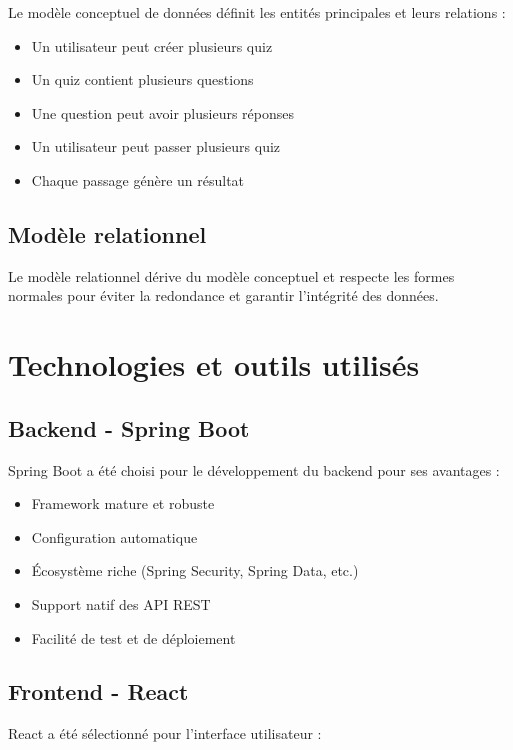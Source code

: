 \documentclass[12pt,a4paper]{report}
\begin{document}
Le modèle conceptuel de données définit les entités principales et leurs relations :

\begin{itemize}
    \item Un utilisateur peut créer plusieurs quiz
    \item Un quiz contient plusieurs questions
    \item Une question peut avoir plusieurs réponses
    \item Un utilisateur peut passer plusieurs quiz
    \item Chaque passage génère un résultat
\end{itemize}

\subsection{Modèle relationnel}

Le modèle relationnel dérive du modèle conceptuel et respecte les formes normales pour éviter la redondance et garantir l'intégrité des données.

\section{Technologies et outils utilisés}

\subsection{Backend - Spring Boot}

Spring Boot a été choisi pour le développement du backend pour ses avantages :

\begin{itemize}
    \item Framework mature et robuste
    \item Configuration automatique
    \item Écosystème riche (Spring Security, Spring Data, etc.)
    \item Support natif des API REST
    \item Facilité de test et de déploiement
\end{itemize}

\subsection{Frontend - React}

React a été sélectionné pour l'interface utilisateur :
\end{document}
